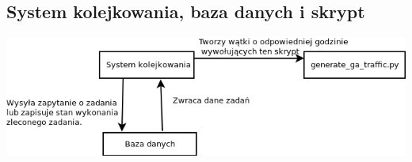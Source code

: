 \documentclass{article}
\begin{document}
\subsection{System kolejkowania, baza danych i skrypt}
\begin{center}\includegraphics[scale=0.5]{system}\end{center}
\end{document}
